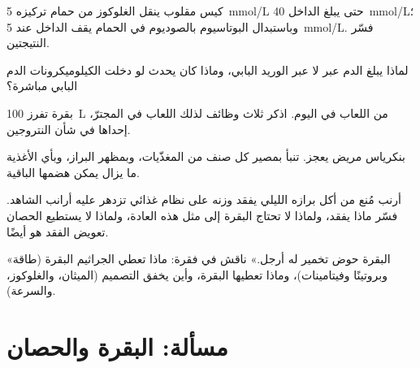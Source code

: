 \begin{exercise}[$\star\star$]\label{exo:b1:digestion-absorption:7}
كيس مقلوب ينقل الغلوكوز من حمام تركيزه \qty{5}{mmol/L} حتى يبلغ
الداخل \qty{40}{mmol/L}؛ وباستبدال البوتاسيوم بالصوديوم في الحمام
يقف الداخل عند \qty{5}{mmol/L}. فسّر النتيجتين.
\end{exercise}

\begin{exercise}[$\star\star$]\label{exo:b1:digestion-absorption:8}
لماذا يبلغ  الدم عبر  لا عبر الوريد البابي، وماذا كان
يحدث لو دخلت الكيلوميكرونات الدم البابي مباشرة؟
\end{exercise}

\begin{exercise}[$\star\star$]\label{exo:b1:digestion-absorption:9}
بقرة تفرز \qty{100}{L} من اللعاب في اليوم. اذكر ثلاث وظائف لذلك
اللعاب في المجترّ، إحداها في شأن النتروجين.
\end{exercise}

\begin{exercise}[$\star\star\star$]\label{exo:b1:digestion-absorption:10}
بنكرياس مريض يعجز. تنبأ بمصير كل صنف من المغذّيات، وبمظهر البراز،
وبأي الأغذية ما يزال يمكن هضمها  الباقية.
\end{exercise}

\begin{exercise}[$\star\star\star$]\label{exo:b1:digestion-absorption:11}
أرنب مُنع من أكل برازه الليلي يفقد وزنه على نظام غذائي تزدهر عليه
أرانب الشاهد. فسّر ماذا يفقد، ولماذا لا تحتاج البقرة إلى مثل هذه
العادة، ولماذا لا يستطيع الحصان تعويض الفقد هو أيضًا.
\end{exercise}

\begin{exercise}[$\star\star\star$]\label{exo:b1:digestion-absorption:12}
«البقرة حوض تخمير له أرجل.» ناقش في فقرة: ماذا تعطي الجراثيم
البقرة (طاقة وبروتينًا وفيتامينات)، وماذا تعطيها البقرة، وأين
يخفق التصميم (الميثان، والغلوكوز، والسرعة).
\end{exercise}

\section{مسألة: البقرة والحصان}

